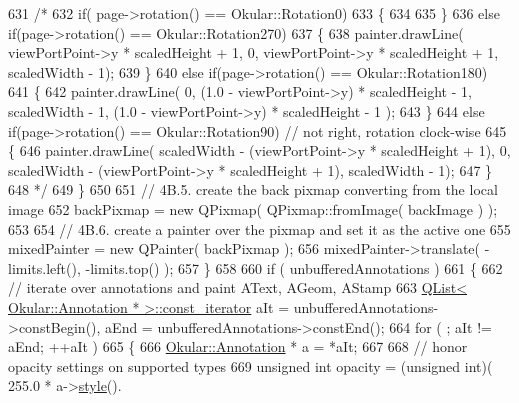 \begin{DoxyCode}
631 \textcolor{comment}{/*}
632 \textcolor{comment}{            if( page->rotation() == Okular::Rotation0)}
633 \textcolor{comment}{            \{}
634 \textcolor{comment}{}
635 \textcolor{comment}{            \}}
636 \textcolor{comment}{            else if(page->rotation() == Okular::Rotation270)}
637 \textcolor{comment}{            \{}
638 \textcolor{comment}{                painter.drawLine( viewPortPoint->y * scaledHeight + 1, 0, viewPortPoint->y * scaledHeight +
       1, scaledWidth - 1);}
639 \textcolor{comment}{            \}}
640 \textcolor{comment}{            else if(page->rotation() == Okular::Rotation180)}
641 \textcolor{comment}{            \{}
642 \textcolor{comment}{                painter.drawLine( 0, (1.0 - viewPortPoint->y) * scaledHeight - 1, scaledWidth - 1, (1.0 -
       viewPortPoint->y) * scaledHeight - 1 );}
643 \textcolor{comment}{            \}}
644 \textcolor{comment}{            else if(page->rotation() == Okular::Rotation90) // not right, rotation clock-wise}
645 \textcolor{comment}{            \{}
646 \textcolor{comment}{                painter.drawLine( scaledWidth - (viewPortPoint->y * scaledHeight + 1), 0, scaledWidth -
       (viewPortPoint->y * scaledHeight + 1), scaledWidth - 1);}
647 \textcolor{comment}{            \}}
648 \textcolor{comment}{*/}
649         \}
650 
651         \textcolor{comment}{// 4B.5. create the back pixmap converting from the local image}
652         backPixmap = \textcolor{keyword}{new} QPixmap( QPixmap::fromImage( backImage ) );
653 
654         \textcolor{comment}{// 4B.6. create a painter over the pixmap and set it as the active one}
655         mixedPainter = \textcolor{keyword}{new} QPainter( backPixmap );
656         mixedPainter->translate( -limits.left(), -limits.top() );
657     \}
658 
660     \textcolor{keywordflow}{if} ( unbufferedAnnotations )
661     \{
662         \textcolor{comment}{// iterate over annotations and paint AText, AGeom, AStamp}
663         \hyperlink{classQList}{QList< Okular::Annotation * >::const\_iterator} aIt = 
      unbufferedAnnotations->constBegin(), aEnd = unbufferedAnnotations->constEnd();
664         \textcolor{keywordflow}{for} ( ; aIt != aEnd; ++aIt )
665         \{
666             \hyperlink{classOkular_1_1Annotation}{Okular::Annotation} * a = *aIt;
667 
668             \textcolor{comment}{// honor opacity settings on supported types}
669             \textcolor{keywordtype}{unsigned} \textcolor{keywordtype}{int} opacity = (\textcolor{keywordtype}{unsigned} int)( 255.0 * a->\hyperlink{classOkular_1_1Annotation_ae1f845ddbd6d524b2b388c6c9ef26423}{style}().

\end{DoxyCode}
